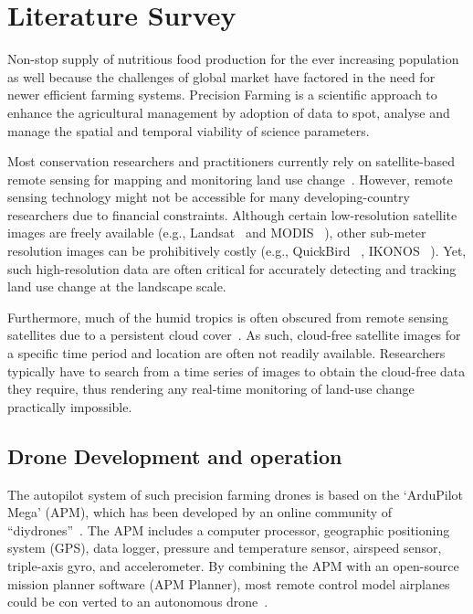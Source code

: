 \chapter{Literature Survey}

Non-stop supply of nutritious food production for the ever increasing population as well because the challenges of global market have factored in the need for newer efficient farming systems. Precision Farming is a scientific approach to enhance the agricultural management by adoption of data to spot, analyse and manage the spatial and temporal viability of science parameters. 


Most conservation researchers and practitioners currently rely on satellite-based remote sensing for mapping and monitoring land use change~\cite{broich2011time}. However, remote sensing technology might not be accessible for many developing-country researchers due to financial constraints. Although certain low-resolution satellite images are freely available (e.g., Landsat~\cite{LandsatS1:online} and MODIS ~\cite{LandsatS40:online}), other sub-meter resolution images can be prohibitively costly (e.g., QuickBird ~\cite{LandsatS4:online}, IKONOS ~\cite{geoeyeco87:online}). Yet, such high-resolution data are often critical for accurately detecting and tracking land use change at the landscape scale.

Furthermore, much of the humid tropics is often obscured from remote sensing satellites due to a persistent cloud cover~\cite{hansen2008method}. As such, cloud-free satellite images for a specific time period and location are often not readily available. Researchers typically have to search from a time series of images to obtain the cloud-free data they require, thus rendering any real-time monitoring of land-use change practically impossible. 

\section{Drone Development and operation}
The autopilot system of such precision farming drones is based on the ‘ArduPilot Mega’ (APM), which has been developed by an online community of ``diydrones''~\cite{diydrone38:online}. The APM includes a computer processor, geographic positioning system (GPS), data logger, pressure and temperature sensor, airspeed sensor, triple-axis gyro, and accelerometer. By combining the APM with an open-source mission planner software (APM Planner), most remote control model airplanes could be con verted to an autonomous drone~\cite{ardupilo77:online}.

